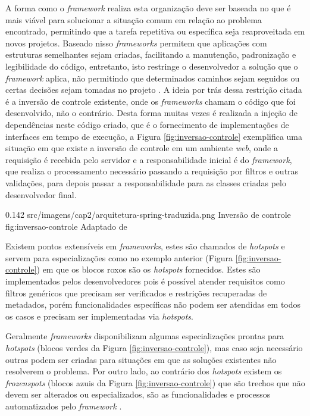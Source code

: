 \par A forma como o \textit{framework} realiza esta organização deve ser baseada no que é mais viável para solucionar a situação comum em relação ao problema encontrado, permitindo que a tarefa repetitiva ou específica seja reaproveitada em novos projetos.
Baseado nisso \textit{frameworks} permitem que aplicações com estruturas semelhantes sejam criadas, facilitando a manutenção, padronização e legibilidade do código, entretanto, isto restringe o desenvolvedor a solução que o \textit{framework} aplica, não permitindo que determinados caminhos sejam seguidos ou certas decisões sejam tomadas no projeto \cite{gamma2009padroes}. A ideia por trás dessa restrição citada é a inversão de controle existente, onde os \textit{frameworks} chamam o código que foi desenvolvido, não o contrário. Desta forma muitas vezes é realizada a injeção de dependências neste código criado, que é o fornecimento de implementações de interfaces em tempo de execução, a Figura \ref{fig:inversao-controle} exemplifica uma situação em que existe a inversão de controle em um ambiente \textit{web}, onde a requisição é recebida pelo servidor e a responsabilidade inicial é do \textit{framework}, que realiza o processamento necessário passando a requisição por filtros e outras validações, para depois passar a responsabilidade para as classes criadas pelo desenvolvedor final.

\begin{image}
{0.142} %
{src/imagens/cap2/arquitetura-spring-traduzida.png} %
{Inversão de controle} %
{fig:inversao-controle} %
{Adaptado de } %
\end{image}

\par Existem pontos extensíveis em \textit{frameworks}, estes são chamados de \textit{hotspots} e servem para especializações como no exemplo anterior (Figura \ref{fig:inversao-controle}) em que os blocos roxos são os \textit{hotspots} fornecidos. Estes são implementados pelos desenvolvedores pois é possível atender requisitos como filtros genéricos que precisam ser verificados e restrições recuperadas de metadados, porém funcionalidades específicas não podem ser atendidas em todos os casos e precisam ser implementadas via \textit{hotspots}.

\par Geralmente \textit{frameworks} disponibilizam algumas especializações prontas para \textit{hotspots} (blocos verdes da Figura \ref{fig:inversao-controle}), mas caso seja necessário outras podem ser criadas para situações em que as soluções existentes não resolverem o problema. Por outro lado, ao contrário dos \textit{hotspots} existem os \textit{frozenspots} (blocos azuis da Figura \ref{fig:inversao-controle}) que são trechos que não devem ser alterados ou especializados, são as funcionalidades e processos automatizados pelo \textit{framework} \cite{markiewicz2001object}.

